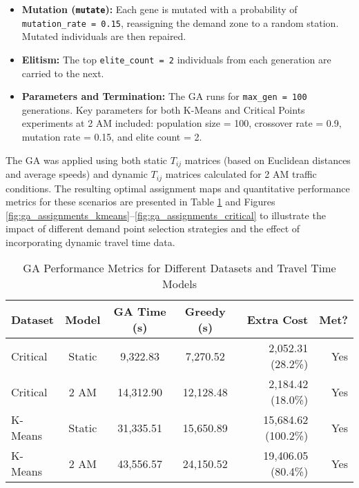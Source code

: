 \documentclass[conference]{IEEEtran}
\begin{document}
\begin{itemize}
    \item \textbf{Mutation (\texttt{mutate}):} Each gene is mutated with a probability of \texttt{mutation\_rate = 0.15}, reassigning the demand zone to a random station. Mutated individuals are then repaired.

    \item \textbf{Elitism:} The top \texttt{elite\_count = 2} individuals from each generation are carried to the next.

    \item \textbf{Parameters and Termination:} The GA runs for \texttt{max\_gen = 100} generations. Key parameters for both K-Means and Critical Points experiments at 2 AM included: population size = 100, crossover rate = 0.9, mutation rate = 0.15, and elite count = 2.
\end{itemize}
The GA was applied using both static $T_{ij}$ matrices (based on Euclidean distances and average speeds) and dynamic $T_{ij}$ matrices calculated for 2 AM traffic conditions. The resulting optimal assignment maps and quantitative performance metrics for these scenarios are presented in Table \ref{tab:ga_results} and Figures \ref{fig:ga_assignments_kmeans}--\ref{fig:ga_assignments_critical} to illustrate the impact of different demand point selection strategies and the effect of incorporating dynamic travel time data.

\begin{table}[htbp]
\centering
\caption{GA Performance Metrics for Different Datasets and Travel Time Models}
\label{tab:ga_results}
\begin{tabular}{lcccrr}
\toprule
\textbf{Dataset} & \textbf{Model} & \textbf{GA Time (s)} & \textbf{Greedy (s)} & \textbf{Extra Cost} & \textbf{Met?} \\
\midrule
Critical & Static & 9,322.83 & 7,270.52 & 2,052.31 (28.2\%) & Yes \\
Critical & 2 AM & 14,312.90 & 12,128.48 & 2,184.42 (18.0\%) & Yes \\
K-Means & Static & 31,335.51 & 15,650.89 & 15,684.62 (100.2\%) & Yes \\
K-Means & 2 AM & 43,556.57 & 24,150.52 & 19,406.05 (80.4\%) & Yes \\
\bottomrule
\end{tabular}
\end{table}
\end{document}
